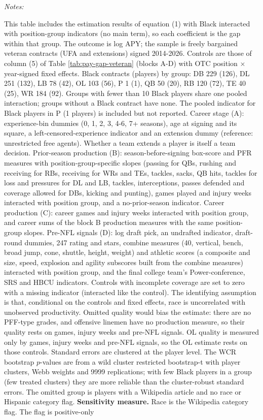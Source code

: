 \begin{table}[!h]
{\begin{threeparttable}
\begin{tablenotes}[para]
\item \textit{Notes:} 
\item This table includes the estimation results of equation (1) with Black interacted with position-group indicators (no main term), so each coefficient is the gap within that group. The outcome is log APY; the sample is freely bargained veteran contracts (UFA and extensions) signed 2014-2026. Controls are those of column (5) of Table \ref{tab:pay-gap-veteran} (blocks A-D) with OTC position $\times$ year-signed fixed effects. Black contracts (players) by group: DB 229 (126), DL 251 (132), LB 78 (42), OL 103 (56), P 1 (1), QB 50 (20), RB 120 (72), TE 40 (25), WR 184 (92). Groups with fewer than 10 Black players share one pooled interaction; groups without a Black contract have none. The pooled indicator for Black players in P (1 players) is included but not reported. Career stage (A): experience-bin dummies (0, 1, 2, 3, 4-6, 7+ seasons), age at signing and its square, a left-censored-experience indicator and an extension dummy (reference: unrestricted free agents). Whether a team extends a player is itself a team decision. Prior-season production (B): season-before-signing box-score and PFR measures with position-group-specific slopes (passing for QBs, rushing and receiving for RBs, receiving for WRs and TEs, tackles, sacks, QB hits, tackles for loss and pressures for DL and LB, tackles, interceptions, passes defended and coverage allowed for DBs, kicking and punting), games played and injury weeks interacted with position group, and a no-prior-season indicator. Career production (C): career games and injury weeks interacted with position group, and career sums of the block B production measures with the same position-group slopes. Pre-NFL signals (D): log draft pick, an undrafted indicator, draft-round dummies, 247 rating and stars, combine measures (40, vertical, bench, broad jump, cone, shuttle, height, weight) and athletic scores (a composite and size, speed, explosion and agility subscores built from the combine measures) interacted with position group, and the final college team's Power-conference, SRS and HBCU indicators. Controls with incomplete coverage are set to zero with a missing indicator (interacted like the control). The identifying assumption is that, conditional on the controls and fixed effects, race is uncorrelated with unobserved productivity. Omitted quality would bias the estimate: there are no PFF-type grades, and offensive linemen have no production measure, so their quality rests on games, injury weeks and pre-NFL signals. OL quality is measured only by games, injury weeks and pre-NFL signals, so the OL estimate rests on those controls. Standard errors are clustered at the player level. The WCR bootstrap $p$-values are from a wild cluster restricted bootstrap-t with player clusters, Webb weights and 9999 replications; with few Black players in a group (few treated clusters) they are more reliable than the cluster-robust standard errors. The omitted group is players with a Wikipedia article and no race or Hispanic category flag. \textbf{Sensitivity measure.} Race is the Wikipedia category flag. The flag is positive-only 
\end{tablenotes}
\end{threeparttable}}
\end{table}

